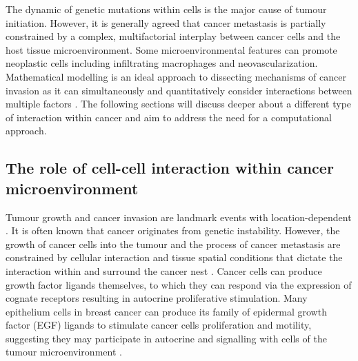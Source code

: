 The dynamic of genetic mutations within cells is the major cause of tumour initiation. However, it is generally agreed that cancer metastasis is partially constrained by a complex, multifactorial interplay between cancer cells and the host tissue microenvironment. Some microenvironmental features can promote neoplastic cells including infiltrating macrophages and neovascularization. Mathematical modelling is an ideal approach to dissecting mechanisms of cancer invasion as it can simultaneously and quantitatively consider interactions between multiple factors \cite{anderson2006tumor}. The following sections will discuss deeper about a different type of interaction within cancer and aim to address the need for a computational approach.       

\subsection{The role of cell-cell interaction within cancer microenvironment}
Tumour growth and cancer invasion are landmark events with location-dependent \cite{friedl2011cancer}. It is often known that cancer originates from genetic instability. However, the growth of cancer cells into the tumour and the process of cancer metastasis are constrained by cellular interaction and tissue spatial conditions that dictate the interaction within and surround the cancer nest \cite{west2019cellular, liotta2001microenvironment,anderson2006tumor}. Cancer cells can produce growth factor ligands themselves, to which they can respond via the expression of cognate receptors resulting in autocrine proliferative stimulation. Many epithelium cells in breast cancer can produce its family of epidermal growth factor (EGF) ligands to stimulate cancer cells proliferation and motility, suggesting they may participate in autocrine and signalling with cells of the tumour microenvironment \cite{nickerson2013autocrine}.  

